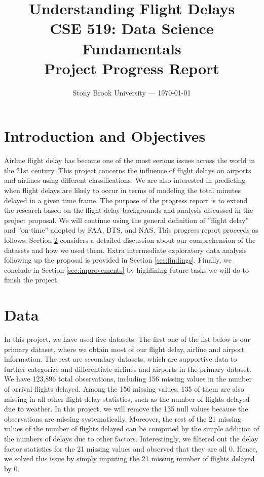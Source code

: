 \documentclass[11pt, letterpaper]{article}
\title{\textbf{Understanding Flight Delays}\\\textbf{CSE 519: Data Science Fundamentals}\\\textbf{Project Progress Report}}
\date{Stony Brook University --- \today}
\begin{document}
\maketitle

\section{Introduction and Objectives}
Airline flight delay has become one of the most serious issues across the world in the 21st century. This project concerns the influence of flight delays on airports and airlines using different classifications. We are also interested in predicting when flight delays are likely to occur in terms of modeling the total minutes delayed in a given time frame. The purpose of the progress report is to extend the research based on the flight delay backgrounds and analysis discussed in the project proposal. We will continue using the general definition of ”flight delay” and ”on-time” adopted by FAA, BTS, and NAS. This progress report proceeds as follows: Section \ref{sec:data} considers a detailed discussion about our comprehension of the datasets and how we used them. Extra intermediate exploratory data analysis following up the proposal is provided in Section \ref{sec:findings}. Finally, we conclude in Section \ref{sec:improvements} by highlining future tasks we will do to finish the project.

\section{Data}\label{sec:data}
In this project, we have used five datasets. The first one of the list below is our primary dataset, where we obtain most of our flight delay, airline and airport information. The rest are secondary datasets, which are supportive data to further categorize and differentiate airlines and airports in the primary dataset. We have 123,896 total observations, including 156 missing values in the number of arrival flights delayed. Among the 156 missing values, 135 of them are also missing in all other flight delay statistics, such as the number of flights delayed due to weather. In this project, we will remove the 135 null values because the observations are missing systematically. Moreover, the rest of the 21 missing values of the number of flights delayed can be computed by the simple addition of the numbers of delays due to other factors. Interestingly, we filtered out the delay factor statistics for the 21 missing values and observed that they are all 0. Hence, we solved this issue by simply imputing the 21 missing number of flights delayed by 0.
\end{document}

